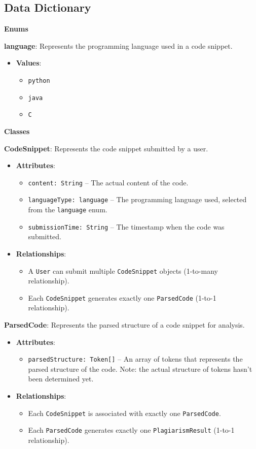 \documentclass[12pt]{article}
\begin{document}
\subsection{Data Dictionary}

\textbf{Enums}

\textbf{language}: Represents the programming language used in a code snippet.
\begin{itemize}
    \item \textbf{Values}:
    \begin{itemize}
        \item \texttt{python}
        \item \texttt{java}
        \item \texttt{C}
    \end{itemize}
\end{itemize}

\textbf{Classes}

\textbf{CodeSnippet}: Represents the code snippet submitted by a user.
\begin{itemize}
    \item \textbf{Attributes}:
    \begin{itemize}
        \item \texttt{content: String} -- The actual content of the code.
        \item \texttt{languageType: language} -- The programming language used, selected from the \texttt{language} enum.
        \item \texttt{submissionTime: String} -- The timestamp when the code was submitted.
    \end{itemize}
    \item \textbf{Relationships}:
    \begin{itemize}
        \item A \texttt{User} can submit multiple \texttt{CodeSnippet} objects (1-to-many relationship).
        \item Each \texttt{CodeSnippet} generates exactly one \texttt{ParsedCode} (1-to-1 relationship).
    \end{itemize}
\end{itemize}

\textbf{ParsedCode}: Represents the parsed structure of a code snippet for analysis.
\begin{itemize}
    \item \textbf{Attributes}:
    \begin{itemize}
        \item \texttt{parsedStructure: Token[]} -- An array of tokens that represents the parsed structure of the code. Note: the actual structure of tokens hasn't been determined yet.
    \end{itemize}
    \item \textbf{Relationships}:
    \begin{itemize}
        \item Each \texttt{CodeSnippet} is associated with exactly one \texttt{ParsedCode}.
        \item Each \texttt{ParsedCode} generates exactly one \texttt{PlagiarismResult} (1-to-1 relationship).
    \end{itemize}
\end{itemize}
\end{document}
